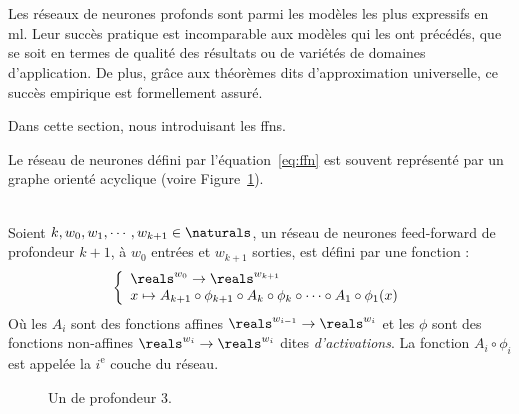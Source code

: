 \section{}

Les réseaux de neurones profonds sont parmi les modèles les plus expressifs en \acrshort{ml}.
Leur succès pratique est incomparable aux modèles qui les ont précédés, 
que se soit en termes de qualité des résultats ou de variétés de domaines d'application.
De plus, grâce aux théorèmes dits d'approximation universelle, ce succès empirique est formellement assuré.

Dans cette section, nous introduisant les \glspl{ffn}.



Le réseau de neurones défini par l'équation~\ref{eq:ffn} 
est souvent représenté par un graphe orienté acyclique (voire Figure~\ref{fig:ffn}).


\begin{definition}\ \\
    \label{def:ffn}
    Soient \(k, w_0, w_1, \cdots, w_{k+1}\in\naturals\), 
    un réseau de neurones feed-forward de profondeur \(k+1\), à \(w_0\) entrées et \(w_{k+1}\) sorties, 
    est défini par une fonction :
    \begin{equation}
        \label{eq:ffn}
        \left\{
        \begin{array}{l}
            \reals^{w_0} \to \reals^{w_{k+1}}\\
            x\mapsto
            A_{k+1} \circ \phi_{k+1} \circ A_k \circ \phi_k \circ \cdots \circ A_1 \circ \phi_1(x)
        \end{array}
        \right.
    \end{equation}
    Où les \(A_i\) sont des fonctions affines \(\reals^{w_{i-1}}\to\reals^{w_i}\) 
    et les \(\phi\) sont des fonctions non-affines \(\reals^{w_i}\to\reals^{w_i}\) dites \emph{d'activations}.
    La fonction \(A_i\circ\phi_i\) est appelée la \(i^{\mathrm{e}}\) couche du réseau.


\end{definition}
\begin{figure}[hbt]
    \begin{center}
        
    \end{center}
    \caption{Un  de profondeur 3.}
    \label{fig:ffn}
\end{figure}
